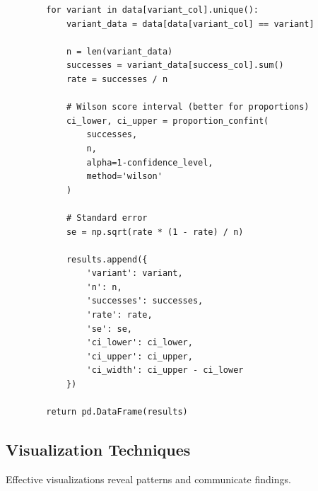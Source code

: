 \begin{lstlisting}
        for variant in data[variant_col].unique():
            variant_data = data[data[variant_col] == variant]

            n = len(variant_data)
            successes = variant_data[success_col].sum()
            rate = successes / n

            # Wilson score interval (better for proportions)
            ci_lower, ci_upper = proportion_confint(
                successes,
                n,
                alpha=1-confidence_level,
                method='wilson'
            )

            # Standard error
            se = np.sqrt(rate * (1 - rate) / n)

            results.append({
                'variant': variant,
                'n': n,
                'successes': successes,
                'rate': rate,
                'se': se,
                'ci_lower': ci_lower,
                'ci_upper': ci_upper,
                'ci_width': ci_upper - ci_lower
            })

        return pd.DataFrame(results)
\end{lstlisting}

\subsection{Visualization Techniques}

Effective visualizations reveal patterns and communicate findings.


